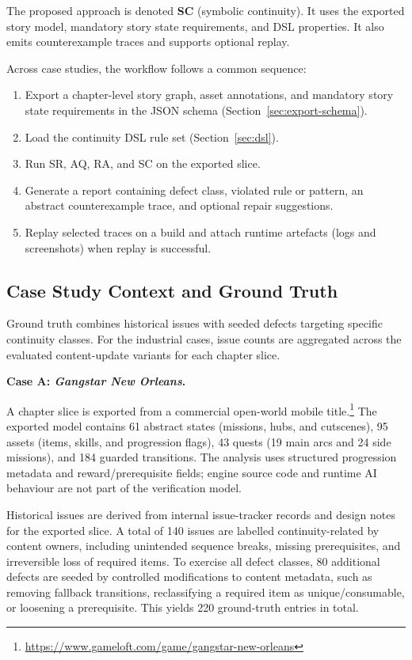 \documentclass[conference]{IEEEtran}
\begin{document}
The proposed approach is denoted \textbf{SC} (symbolic continuity). It
uses the exported story model, mandatory story state requirements, and DSL
properties. It also emits counterexample traces and supports optional
replay.

Across case studies, the workflow follows a common sequence:

\begin{enumerate}[leftmargin=1.3em]
  \item Export a chapter-level story graph, asset annotations, and
        mandatory story state requirements in the JSON schema
        (Section~\ref{sec:export-schema}).
  \item Load the continuity DSL rule set (Section~\ref{sec:dsl}).
  \item Run SR, AQ, RA, and SC on the exported slice.
  \item Generate a report containing defect class, violated rule or
        pattern, an abstract counterexample trace, and optional repair
        suggestions.
  \item Replay selected traces on a build and attach runtime artefacts
        (logs and screenshots) when replay is successful.
\end{enumerate}


\subsection{Case Study Context and Ground Truth}
\label{sec:case-studies}

Ground truth combines historical issues with seeded defects targeting
specific continuity classes. For the industrial cases, issue counts are
aggregated across the evaluated content-update variants for each chapter
slice.

\noindent\textbf{Case A: \emph{Gangstar New Orleans}.}

A chapter slice is exported from a commercial open-world mobile
title.\footnote{\url{https://www.gameloft.com/game/gangstar-new-orleans}}
The exported model contains 61 abstract states (missions, hubs, and
cutscenes), 95 assets (items, skills, and progression flags), 43 quests
(19 main arcs and 24 side missions), and 184 guarded transitions. The
analysis uses structured progression metadata and reward/prerequisite
fields; engine source code and runtime AI behaviour are not part of the
verification model.

Historical issues are derived from internal issue-tracker
records and design notes for the exported slice. A total of 140 issues are
labelled continuity-related by content owners, including unintended sequence
breaks, missing prerequisites, and irreversible loss of required items.
To exercise all defect classes, 80 additional defects are seeded by
controlled modifications to content metadata, such as removing fallback
transitions, reclassifying a required item as unique/consumable, or
loosening a prerequisite. This yields 220 ground-truth entries in total.
\end{document}
